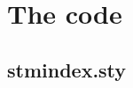 \documentclass{scrartcl}
\begin{document}




\printstmindex


\newpage
\appendix

\section{The code}

\subsection{stmindex.sty}




% 


% 
\end{document}
